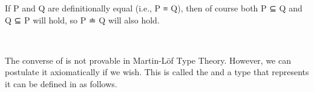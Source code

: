If \ab P and \ab Q are definitionally equal (i.e., \ab P \aod ≡ \ab Q), then of course both \ab P \aof ⊆ \ab Q and
\ab Q \aof ⊆ \ab P will hold, so \ab P \aof ≐ \ab Q will also hold.
\ccpad
\begin{code}%
\>[0]\AgdaSpace{}%
\AgdaSymbol{:}\AgdaSpace{}%
\AgdaSymbol{\{}\AgdaSpace{}%
\AgdaSpace{}%
\AgdaSymbol{:}\AgdaSpace{}%
\AgdaSymbol{\}\{}\AgdaSpace{}%
\AgdaSymbol{:}\AgdaSpace{}%
\AgdaSpace{}%
\AgdaSymbol{\}\{}\AgdaSpace{}%
\AgdaSpace{}%
\AgdaSymbol{:}\AgdaSpace{}%
\AgdaSpace{}%
\AgdaSpace{}%
\AgdaSymbol{\}}\AgdaSpace{}%
\AgdaSpace{}%
\AgdaSpace{}%
\AgdaSpace{}%
\AgdaSpace{}%
\AgdaSpace{}%
\AgdaSpace{}%
\AgdaSpace{}%
\<%
\\
\>[0]\AgdaSpace{}%
\AgdaSpace{}%
\AgdaSymbol{=}\AgdaSpace{}%
\AgdaSpace{}%
\AgdaSpace{}%
\AgdaSpace{}%
\AgdaSymbol{)}\AgdaSpace{}%
\AgdaOperator{\AgdaInductiveConstructor{,}}\AgdaSpace{}%
\AgdaSpace{}%
\AgdaSpace{}%
\AgdaSpace{}%
\AgdaSymbol{)}\<%
\end{code}
\ccpad
The converse of  is not provable in Martin-L\"of Type Theory. However, we can postulate it axiomatically if we wish. This is called the  and a type that represents it can be defined in \agda as follows.
\ccpad
\begin{code}%
\>[0]\AgdaSpace{}%
\AgdaSymbol{:}\AgdaSpace{}%
\AgdaSymbol{\{}\AgdaSpace{}%
\AgdaSymbol{:}\AgdaSpace{}%
\AgdaSymbol{\}}\AgdaSpace{}%
\AgdaSpace{}%
\AgdaSpace{}%
\AgdaSpace{}%
\AgdaSpace{}%
\AgdaSymbol{(}\AgdaSpace{}%
\AgdaSymbol{:}\AgdaSpace{}%
\AgdaSymbol{)}\AgdaSpace{}%
\AgdaSpace{}%
\AgdaSpace{}%
\AgdaSpace{}%
\AgdaSpace{}%
\AgdaSpace{}%
\<%
\\
\>[0]\AgdaSpace{}%
\AgdaSpace{}%
\AgdaSpace{}%
\AgdaSymbol{=}\AgdaSpace{}%
\AgdaSpace{}%
\AgdaSymbol{(}\AgdaSpace{}%
\AgdaSpace{}%
\AgdaSymbol{:}\AgdaSpace{}%
\AgdaSpace{}%
\AgdaSpace{}%
\AgdaSymbol{)}\AgdaSpace{}%
\AgdaSpace{}%
\AgdaSpace{}%
\AgdaSpace{}%
\AgdaSpace{}%
\AgdaSpace{}%
\AgdaSpace{}%
\AgdaSpace{}%
\<%
\end{code}
